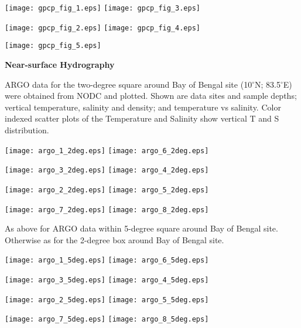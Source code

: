 \documentclass[letterpaper,12pt,oneside]{article}
\newcommand{\degree}{\ensuremath{^\circ}}
\newcommand{\SPURS}{Bay of Bengal}
\newcommand{\SitePos}{10\degree{N}; 83.5\degree{E}}
\begin{document}
\begin{center}
\texttt{[image: gpcp\_fig\_1.eps]}
\texttt{[image: gpcp\_fig\_3.eps]} 

\texttt{[image: gpcp\_fig\_2.eps]}
\texttt{[image: gpcp\_fig\_4.eps]}

\texttt{[image: gpcp\_fig\_5.eps]}
\end{center}

\clearpage

\begin{center}
\large\textbf{Near-surface Hydrography}
\end{center}

ARGO data for the two-degree square around \SPURS{} site (\SitePos) were
obtained from NODC and plotted. Shown are data sites and sample depths;
vertical temperature, salinity and density; and temperature vs salinity.  Color
indexed scatter plots of the Temperature and Salinity show vertical T and S
distribution. 

\begin{center}
\texttt{[image: argo\_1\_2deg.eps]}
\texttt{[image: argo\_6\_2deg.eps]}

\texttt{[image: argo\_3\_2deg.eps]} 
\texttt{[image: argo\_4\_2deg.eps]}

\texttt{[image: argo\_2\_2deg.eps]}
\texttt{[image: argo\_5\_2deg.eps]} 

\texttt{[image: argo\_7\_2deg.eps]}
\texttt{[image: argo\_8\_2deg.eps]} 
\end{center}

\clearpage

As above for ARGO data within 5-degree square around \SPURS{} site. Otherwise
as for the 2-degree box around \SPURS{} site.

\begin{center}
\texttt{[image: argo\_1\_5deg.eps]}
\texttt{[image: argo\_6\_5deg.eps]}

\texttt{[image: argo\_3\_5deg.eps]} 
\texttt{[image: argo\_4\_5deg.eps]}

\texttt{[image: argo\_2\_5deg.eps]}
\texttt{[image: argo\_5\_5deg.eps]} 

\texttt{[image: argo\_7\_5deg.eps]}
\texttt{[image: argo\_8\_5deg.eps]} 
\end{center}
\end{document}
